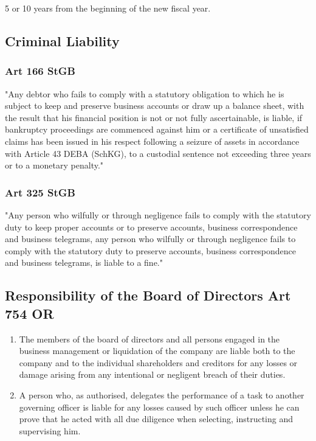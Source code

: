 \documentclass[11pt]{article}
\theoremstyle{definition}
\begin{document}
5 or 10 years from the beginning of the new fiscal year.

\subsection{Criminal Liability}
\subsubsection{Art 166 StGB}
"Any debtor who fails to comply with a statutory obligation to which he is subject to keep and preserve business accounts or draw up a balance sheet, with the result that his financial position is not or not fully ascertainable, is liable, if bankruptcy proceedings are commenced against him or a certificate of unsatisfied claims has been issued in his respect following a seizure of assets in accordance with Article 43 DEBA (SchKG), to a custodial sentence not exceeding three years or to a monetary penalty."

\subsubsection{Art 325 StGB}
"Any person who wilfully or through negligence fails to comply with the statutory duty to keep proper accounts or to preserve accounts, business correspondence and business telegrams, any person who wilfully or through negligence fails to comply with the statutory duty to preserve accounts, business correspondence and business telegrams, is liable to a fine."

\subsection{Responsibility of the Board of Directors Art 754 OR}
\begin{enumerate}[label=\arabic* ]
	\item The members of the board of directors and all persons engaged in the business management or liquidation of the company are liable both to the company and to the individual shareholders and creditors for any losses or damage arising from any intentional or negligent breach of their duties.
	\item A person who, as authorised, delegates the performance of a task to another governing officer is liable for any losses caused by such officer unless he can prove that he acted with all due diligence when selecting, instructing and supervising him.
\end{enumerate}
\end{document}
